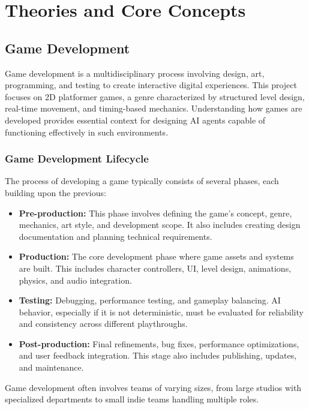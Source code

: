 \documentclass[12pt,oneside,openright,a4paper]{cpe-english-project}
\begin{document}

\section{Theories and Core Concepts}
\subsection{Game Development}
Game development is a multidisciplinary process involving design, art, programming, and testing to create interactive digital experiences. This project focuses on 2D platformer games, a genre characterized by structured level design, real-time movement, and timing-based mechanics. Understanding how games are developed provides essential context for designing AI agents capable of functioning effectively in such environments.
\subsubsection{Game Development Lifecycle}
The process of developing a game typically consists of several phases, each building upon the previous:
\begin{itemize}
\item  \textbf{Pre-production:} This phase involves defining the game’s concept, genre, mechanics, art style, and development scope. It also includes creating design documentation and planning technical requirements.
\item  \textbf{Production:} The core development phase where game assets and systems are built. This includes character controllers, UI, level design, animations, physics, and audio integration.
\item  \textbf{Testing:} Debugging, performance testing, and gameplay balancing. AI behavior, especially if it is not deterministic, must be evaluated for reliability and consistency across different playthroughs.
\item  \textbf{Post-production:} Final refinements, bug fixes, performance optimizations, and user feedback integration. This stage also includes publishing, updates, and maintenance.
\end{itemize}
Game development often involves teams of varying sizes, from large studios with specialized departments to small indie teams handling multiple roles.
\end{document}
